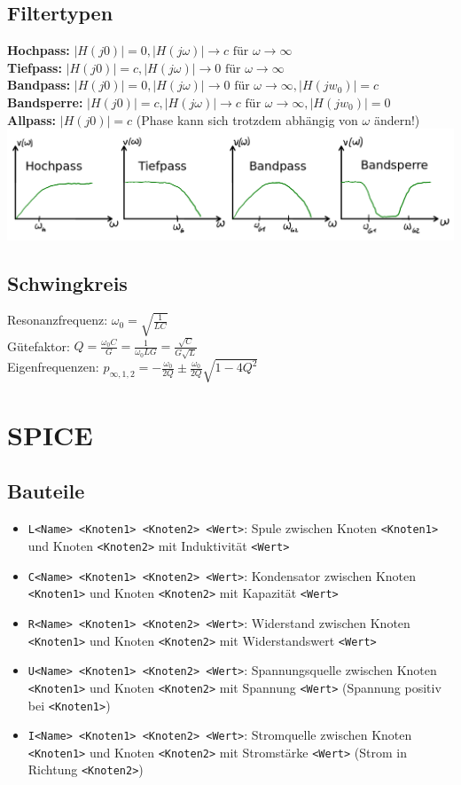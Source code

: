 \documentclass[fs, footer]{latex4ei}
\begin{document}
\begin{multicols*}{4}
\subsection{Filtertypen}
\textbf{Hochpass:} $|H(j0)| = 0, |H(j\omega)| \rightarrow c \text{ für } \omega \rightarrow \infty$\\
\textbf{Tiefpass:} $|H(j0)| = c, |H(j\omega)| \rightarrow 0 \text{ für } \omega \rightarrow \infty$\\
\textbf{Bandpass:} $|H(j0)| = 0, |H(j\omega)| \rightarrow 0 \text{ für } \omega \rightarrow \infty, |H(jw_0)| = c$\\
\textbf{Bandsperre:} $|H(j0)| = c, |H(j\omega)| \rightarrow c \text{ für } \omega \rightarrow \infty, |H(jw_0)| = 0$\\
\textbf{Allpass:} $|H(j0)| = c$ (Phase kann sich trotzdem abhängig von $\omega$ ändern!)\\
\includegraphics[width=\linewidth]{img/filtertypen}
\subsection{Schwingkreis}
Resonanzfrequenz: $\omega_0 = \sqrt{\frac{1}{LC}}$\\
Gütefaktor: $Q = \frac{\omega_0C}{G} = \frac{1}{\omega_0LG} = \frac{\sqrt{C}}{G\sqrt{L}}$\\
Eigenfrequenzen: $p_{\infty,1,2} = -\frac{\omega_0}{2Q}\pm \frac{\omega_0}{2Q}\sqrt{1-4Q^2}$
\section{SPICE}
\renewcommand{\t}{\texttt}
\subsection{Bauteile}
\begin{itemize}
	\item \t{L<Name> <Knoten1> <Knoten2> <Wert>}: Spule zwischen Knoten \t{<Knoten1>} und Knoten \t{<Knoten2>} mit Induktivität \t{<Wert>}
	\item \t{C<Name> <Knoten1> <Knoten2> <Wert>}: Kondensator zwischen Knoten \t{<Knoten1>} und Knoten \t{<Knoten2>} mit Kapazität \t{<Wert>}
	\item \t{R<Name> <Knoten1> <Knoten2> <Wert>}: Widerstand zwischen Knoten \t{<Knoten1>} und Knoten \t{<Knoten2>} mit Widerstandswert \t{<Wert>}
	\item \t{U<Name> <Knoten1> <Knoten2> <Wert>}: Spannungsquelle zwischen Knoten \t{<Knoten1>} und Knoten \t{<Knoten2>} mit Spannung \t{<Wert>} (Spannung positiv bei \t{<Knoten1>})
	\item \t{I<Name> <Knoten1> <Knoten2> <Wert>}: Stromquelle zwischen Knoten \t{<Knoten1>} und Knoten \t{<Knoten2>} mit Stromstärke \t{<Wert>} (Strom in Richtung \t{<Knoten2>})
\end{itemize}

\end{multicols*}
\end{document}
